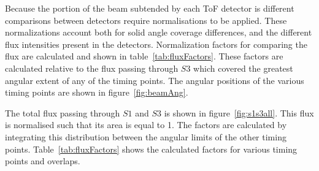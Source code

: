 	Because the portion of the beam subtended by each ToF detector is different comparisons between detectors require normalisations to be applied. 
	These normalizations account both for solid angle coverage differences, and the different flux intensities present in the detectors.
	Normalization factors for comparing the flux are calculated and shown in table~\ref{tab:fluxFactors}.
	These factors are calculated relative to the flux passing through $S3$ which covered the greatest angular extent of any of the timing points. 
	The angular positions of the various timing points are shown in figure~\ref{fig:beamAng}.
	
	\begin{figure}[h]
		
	\end{figure}
		
	The total flux passing through $S1$ and $S3$ is shown in figure~\ref{fig:s1s3all}.
	This flux is normalised such that its area is equal to 1.
	The factors are calculated by integrating this distribution between the angular limits of the other timing points.
	Table~\ref{tab:fluxFactors} shows the calculated factors for various timing points and overlaps.
	
